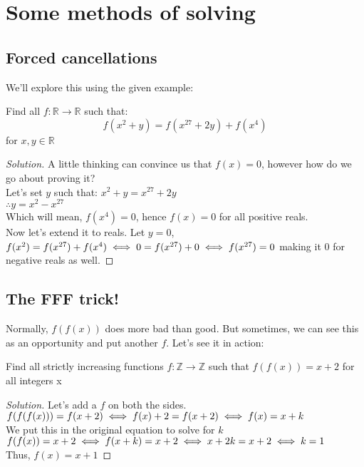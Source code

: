 \section{Some methods of solving}
\subsection{Forced cancellations} We'll explore this using the given example:\\
\begin{example}
    Find all $f: \mathbb{R} \to \mathbb{R}$ such that:
    \[f(x^2+y)=f(x^{27}+2y)+f(x^4)\]
    for $x,y \in \mathbb{R}$
\end{example}
\begin{proof}
    [Solution]
    A little thinking can convince us that $f(x)=0$, however how do we go about proving it?\\
    Let's set $y$ such that: $x^2+y=x^{27}+2y$\\
    $\therefore y=x^2-x^{27}$\\
    Which will mean, $f(x^4)=0$, hence $f(x)=0$ for all positive reals.\\
    Now let's extend it to reals. Let $y=0$,\\
    $f(x^2)=f(x^{27})+f(x^4)\\
    \iff 0=f(x^{27})+0\\
    \iff f(x^{27})=0$ making it 0 for negative reals as well.
\end{proof}
\subsection{The FFF trick!}
Normally, $f(f(x))$ does more bad than good. But sometimes, we can see this as an opportunity and put another $f$. Let's see it in action:
\begin{example}
    Find all strictly increasing functions $f : \mathbb{Z} \to \mathbb{Z}$ such that $f(f(x)) = x + 2$ for all integers x
\end{example}
\begin{proof}
[Solution]
Let's add a $f$ on both the sides.\\
$f(f(f(x)))=f(x+2)\\
\iff f(x)+2=f(x+2)\\
\iff f(x)=x+k$\\
We put this in the original equation to solve for $k$\\
$f(f(x))=x+2\\
\iff f(x+k)=x+2\\
\iff x+2k=x+2\\
\iff k=1$\\
Thus, $f(x)=x+1$
\end{proof}
